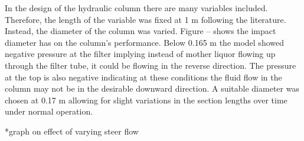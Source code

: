 In the design of the hydraulic column there are many variables included. Therefore, the length of the variable was fixed at 1 m following the literature. Instead, the diameter of the column was varied. Figure -- shows the impact diameter has on the column's performance. Below 0.165 m the model showed negative pressure at the filter implying instead of mother liquor flowing up through the filter tube, it could be flowing in the reverse direction. The pressure at the top is also negative indicating at these conditions the fluid flow in the column may not be in the desirable downward direction. A suitable diameter was chosen at 0.17 m allowing for slight variations in the section lengths over time under normal operation. 

*graph on effect of varying steer flow 

